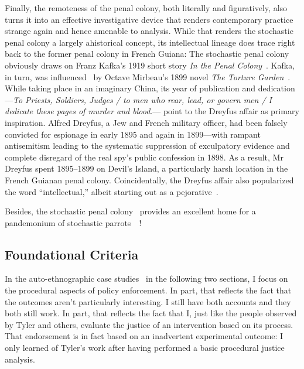 Finally, the remoteness of the penal colony, both literally and figuratively,
also turns it into an effective investigative device that renders contemporary
practice strange again and hence amenable to analysis. While that renders the
stochastic penal colony a largely ahistorical concept, its intellectual lineage
does trace right back to the former penal colony in French Guiana: The
stochastic penal colony obviously draws on Franz Kafka's 1919 short story
\emph{In the Penal Colony}~\cite{Kafka1995}. Kafka, in turn, was
influenced~\cite{Robertson2017} by Octave Mirbeau's 1899 novel \emph{The Torture
Garden}~\cite{Mirbeau2008}. While taking place in an imaginary China, its year
of publication and dedication---\emph{To Priests, Soldiers, Judges / to men who
rear, lead, or govern men / I dedicate these pages of murder and blood}.---%
point to the Dreyfus affair as primary inspiration. Alfred Dreyfus, a Jew and
French military officer, had been falsely convicted for espionage in early 1895
and again in 1899---with rampant antisemitism leading to the systematic
suppression of exculpatory evidence and complete disregard of the real spy's
public confession in 1898. As a result, Mr Dreyfus spent 1895--1899 on Devil's
Island, a particularly harsh location in the French Guianan penal colony.
Coincidentally, the Dreyfus affair also popularized the word ``intellectual,''
albeit starting out as a
pejorative~\cite{Drake2005,StudentsAtTheUniversityOfBristol2021}.

Besides, the stochastic penal colony~ provides an excellent
home for a pandemonium of stochastic
parrots~~\cite{BenderGebruea2021}!


\subsection{Foundational Criteria}
\label{sec:criteria}

In the auto-ethnographic case studies~\cite{Ellis2003} in the following two
sections, I focus on the procedural aspects of policy enforcement. In part, that
reflects the fact that the outcomes aren't particularly interesting. I still
have both accounts and they both still work. In part, that reflects the fact
that I, just like the people observed by Tyler and others, evaluate the justice
of an intervention based on its process. That endorsement is in fact based on an
inadvertent experimental outcome: I only learned of Tyler's work after having
performed a basic procedural justice analysis.


